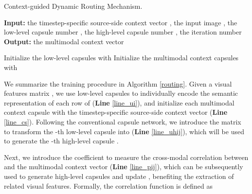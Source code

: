 \documentclass[sigconf]{acmart}
\begin{document}
\begin{spacing}{0.8}
\begin{algorithm}[t!]
\caption{Context-guided Dynamic Routing Mechanism.} \label{routing}
\begin{algorithmic}[1]
\State \textbf{Input:} 
the timestep-specific source-side context vector , 
the input image , 
the low-level capsule number ,
the high-level capsule number , 
the iteration number 
\State \textbf{Output:} the multimodal context vector 

\For{}
\State Initialize the low-level capsules  with  \label{line_ui}
\EndFor
\For{}
\State Initialize the multimodal context capsules  with  \label{line_cs}
\EndFor

\State 
\State  \label{line_uhij}
\State   \label{line_pij}
\EndFor
\EndFor

\For{} \label{line_begin}

\State  \label{line_ci}
\EndFor
\EndFor

\State  \label{line_vj}
\State  \label{line_mj}
\EndFor


\State    \label{line_pij2}
\State  \label{line_bij} 
\EndFor
\EndFor

\EndFor \label{line_end}
\State  \label{line_cm}
\end{algorithmic}
\end{algorithm}
\end{spacing}


We summarize the training procedure in Algorithm \ref{routing}. 
Given a visual features matrix , 
we use low-level capsules  to individually encode the semantic representation of each row of   (\textbf{Line} \ref{line_ui}), 
and initialize each multimodal context capsule  with the timestep-specific source-side context vector  (\textbf{Line} \ref{line_cs}). 
Following the conventional capsule network,
we introduce the matrix  to transform the -th low-level capsule  into  (\textbf{Line} \ref{line_uhij}), 
which will be used to generate the -th high-level capsule .

Next, we introduce the coefficient  to measure the cross-modal correlation between  and the multimodal context vector  (\textbf{Line} \ref{line_pij}), which can be subsequently used to generate high-level capsules  and update , benefiting the extraction of related visual features. 
Formally, 
the correlation function is defined as
\end{document}
